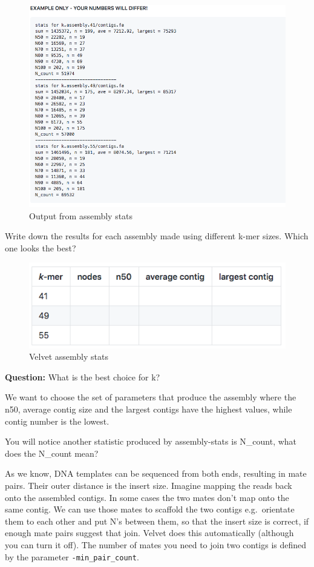 \documentclass[11pt]{article}
\begin{document}
    \begin{figure}
\centering
\includegraphics{images/assembly_stats_output.png}
\caption{Output from assembly stats}
\end{figure}

    Write down the results for each assembly made using different k-mer
sizes. Which one looks the best?

    \begin{figure}
\centering
\includegraphics{images/velvet_stats.png}
\caption{Velvet assembly stats}
\end{figure}

    \textbf{Question:} What is the best choice for k?

We want to choose the set of parameters that produce the assembly where
the n50, average contig size and the largest contigs have the highest
values, while contig number is the lowest.

    You will notice another statistic produced by assembly-stats is
N\_count, what does the N\_count mean?

As we know, DNA templates can be sequenced from both ends, resulting in
mate pairs. Their outer distance is the insert size. Imagine mapping the
reads back onto the assembled contigs. In some cases the two mates don't
map onto the same contig. We can use those mates to scaffold the two
contigs e.g.~orientate them to each other and put N's between them, so
that the insert size is correct, if enough mate pairs suggest that join.
Velvet does this automatically (although you can turn it off). The
number of mates you need to join two contigs is defined by the parameter
\texttt{-min\_pair\_count}.
\end{document}
